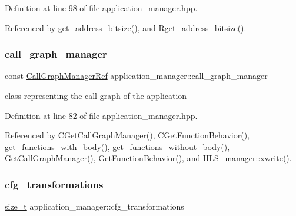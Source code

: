Definition at line 98 of file application\+\_\+manager.\+hpp.



Referenced by get\+\_\+address\+\_\+bitsize(), and Rget\+\_\+address\+\_\+bitsize().

\mbox{\label{classapplication__manager_a2d7ccc7f2e3151e6838f1dc6400ce6d8}} 
\subsubsection{\texorpdfstring{call\+\_\+graph\+\_\+manager}{call\_graph\_manager}}
{\footnotesize\ttfamily const \hyperlink{call__graph__manager_8hpp_aefd741adcd456a04c45fd3df98acdb2c}{Call\+Graph\+Manager\+Ref} application\+\_\+manager\+::call\+\_\+graph\+\_\+manager\hspace{0.3cm}{\ttfamily [protected]}}



class representing the call graph of the application 



Definition at line 82 of file application\+\_\+manager.\+hpp.



Referenced by C\+Get\+Call\+Graph\+Manager(), C\+Get\+Function\+Behavior(), get\+\_\+functions\+\_\+with\+\_\+body(), get\+\_\+functions\+\_\+without\+\_\+body(), Get\+Call\+Graph\+Manager(), Get\+Function\+Behavior(), and H\+L\+S\+\_\+manager\+::xwrite().

\mbox{\label{classapplication__manager_a0cf119f23655908b2699affebfcf109b}} 
\subsubsection{\texorpdfstring{cfg\+\_\+transformations}{cfg\_transformations}}
{\footnotesize\ttfamily \hyperlink{tutorial__fpt__2017_2intro_2sixth_2test_8c_a7c94ea6f8948649f8d181ae55911eeaf}{size\+\_\+t} application\+\_\+manager\+::cfg\+\_\+transformations\hspace{0.3cm}{\ttfamily [protected]}}



